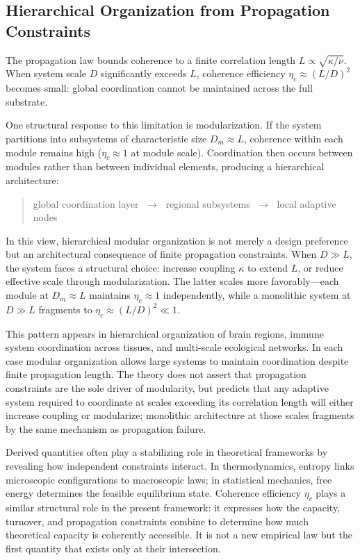 \documentclass[11pt]{article}
\begin{document}
\subsection{Hierarchical Organization from Propagation Constraints}

The propagation law bounds coherence to a finite correlation length $L \propto \sqrt{\kappa/\nu}$. When system scale $D$ significantly exceeds $L$, coherence efficiency $\eta_c \approx (L/D)^2$ becomes small: global coordination cannot be maintained across the full substrate.

One structural response to this limitation is modularization. If the system partitions into subsystems of characteristic size $D_m \approx L$, coherence within each module remains high ($\eta_c \approx 1$ at module scale). Coordination then occurs between modules rather than between individual elements, producing a hierarchical architecture:
\begin{quote}
global coordination layer $\;\longrightarrow\;$ regional subsystems $\;\longrightarrow\;$ local adaptive nodes
\end{quote}
In this view, hierarchical modular organization is not merely a design preference but an architectural consequence of finite propagation constraints. When $D \gg L$, the system faces a structural choice: increase coupling $\kappa$ to extend $L$, or reduce effective scale through modularization. The latter scales more favorably---each module at $D_m \approx L$ maintains $\eta_c \approx 1$ independently, while a monolithic system at $D \gg L$ fragments to $\eta_c \approx (L/D)^2 \ll 1$.

This pattern appears in hierarchical organization of brain regions, immune system coordination across tissues, and multi-scale ecological networks. In each case modular organization allows large systems to maintain coordination despite finite propagation length. The theory does not assert that propagation constraints are the sole driver of modularity, but predicts that any adaptive system required to coordinate at scales exceeding its correlation length will either increase coupling or modularize; monolithic architecture at those scales fragments by the same mechanism as propagation failure.

Derived quantities often play a stabilizing role in theoretical frameworks by revealing how independent constraints interact. In thermodynamics, entropy links microscopic configurations to macroscopic laws; in statistical mechanics, free energy determines the feasible equilibrium state. Coherence efficiency $\eta_c$ plays a similar structural role in the present framework: it expresses how the capacity, turnover, and propagation constraints combine to determine how much theoretical capacity is coherently accessible. It is not a new empirical law but the first quantity that exists only at their intersection.
\end{document}
